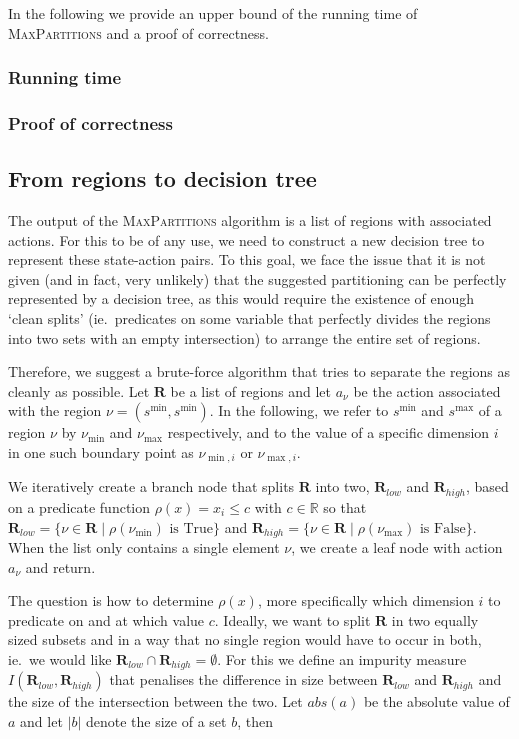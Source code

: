 In the following we provide an upper bound of the running time of
\textsc{MaxPartitions} and a proof of correctness.

\subsubsection{Running time}%
\label{sec:runningTime}

\subsubsection{Proof of correctness}%
\label{sec:proofCorrectness}

\subsection{From regions to decision tree}%
\label{sub:regionsToDT}

The output of the \textsc{MaxPartitions} algorithm is a list of regions with
associated actions. For this to be of any use, we need to construct a new
decision tree to represent these state-action pairs. To this goal, we face the
issue that it is not given (and in fact, very unlikely) that the suggested
partitioning can be perfectly represented by a decision tree, as this would
require the existence of enough `clean splits' (ie.\ predicates on some variable
that perfectly divides the regions into two sets with an empty intersection) to
arrange the entire set of regions.

Therefore, we suggest a brute-force algorithm that tries to separate the regions
as cleanly as possible. Let $\mathbf{R}$ be a list of regions and let $a_{\nu}$
be the action associated with the region $\nu = (s^{\min}, s^{\min})$. In the
following, we refer to $s^{\min}$ and $s^{\max}$ of a region $\nu$ by
$\nu_{\min}$ and $\nu_{\max}$ respectively, and to the value of a specific
dimension $i$ in one such boundary point as $\nu_{\min, i}$ or $\nu_{\max,i}$.

We iteratively create a branch node that splits $\mathbf{R}$ into two,
$\mathbf{R}_{low}$ and $\mathbf{R}_{high}$, based on a predicate function
$\rho(x) = x_i \le c$ with $c \in \mathbb{R}$ so that $\mathbf{R}_{low} = \{ \nu
\in \mathbf{R} \mid \rho(\nu_{\min}) \text{~is True} \}$ and $\mathbf{R}_{high}
= \{ \nu \in \mathbf{R} \mid \rho(\nu_{\max}) \text{~is False} \}$. When the
list only contains a single element $\nu$, we create a leaf node with action
$a_{\nu}$ and return.

The question is how to determine $\rho(x)$, more specifically which dimension
$i$ to predicate on and at which value $c$. Ideally, we want to split
$\mathbf{R}$ in two equally sized subsets and in a way that no single region
would have to occur in both, ie.\ we would like $\mathbf{R}_{low} \cap
\mathbf{R}_{high} = \emptyset$. For this we define an impurity measure
$I(\mathbf{R}_{low},\mathbf{R}_{high})$ that penalises the difference in size
between $\mathbf{R}_{low}$ and $\mathbf{R}_{high}$ and the size of the
intersection between the two. Let $abs(a)$ be the absolute value of $a$ and let
$|b|$ denote the size of a set $b$, then

